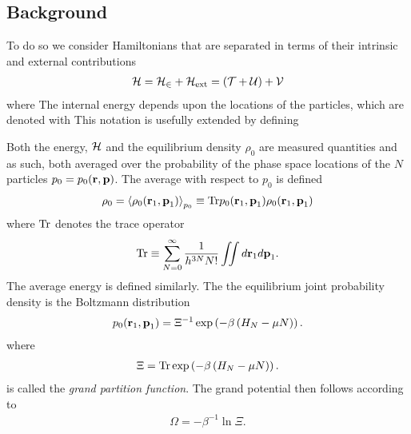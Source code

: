 \subsection{Background}
To do so we consider Hamiltonians that are separated in terms of their intrinsic and external contributions
\begin{align}
  {\cal H} =  {\cal H}_\in + {\cal H}_{\text{ext}} = \left( {\cal{T}} + {\cal{U}} \right) + {\cal{V}}
\end{align}
where 
The internal energy depends upon the  locations of the particles, which are denoted  with
This notation is usefully extended by defining 

Both the energy, ${\cal H}$ and the equilibrium  density $\rho_0$ are measured quantities
and as such, both  averaged over the probability of the phase space locations of the $N$ particles $p_0 = p_0({\mathbf{\textbf{r}}},{\mathbf{\textbf{p}}})$.
The average with respect to $p_0$ is defined
\begin{align}
  \rho_0 =  \left< \rho_0({\mathbf{\textbf{r}}}_1, {\mathbf{\textbf{p}}}_1)  \right>_{p_0} \equiv \textrm{Tr} p_0({\mathbf{\textbf{r}}}_1, {\mathbf{\textbf{p}}}_1) \rho_0({\mathbf{\textbf{r}}}_1, {\mathbf{\textbf{p}}}_1) 
\end{align}
where $\textrm{Tr}$ denotes the trace operator
\begin{align}
  \textrm{Tr} \equiv \sum_{N=0}^\infty \frac{1}{h^{3N}N!} \iint d{\mathbf{\textbf{r}}}_1 d{\mathbf{\textbf{p}}}_1.
\end{align}
The average energy is defined similarly.
The the equilibrium 
joint 
 probability density  is  the Boltzmann distribution 
\begin{align}
  p_0({\mathbf{\textbf{r}}}_1, {\mathbf{\textbf{p}}}_1) = \Xi^{-1} \exp\left( -\beta \left( H_N - \mu N \right) \right).
\end{align}
where 
\begin{align}
  \Xi = \textrm{Tr} \exp\left( -\beta \left( H_N - \mu N \right) \right). \label{eqn:nuc:GPF}
\end{align}
is called the {\em grand partition function}.
The grand potential then follows according to 
\begin{align}
  \Omega = -\beta^{-1}\ln \Xi.
\end{align}

